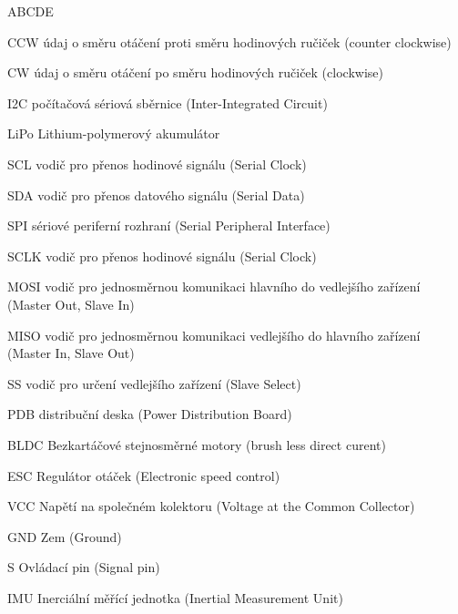 
\begin{seznamzkratek}{ABCDE}  
	
			{CCW}
			{údaj o směru otáčení proti směru hodinových ručiček  (counter clockwise)}
	
			{CW}
			{údaj o směru otáčení po směru hodinových ručiček (clockwise)}    
	      
	      {I2C}
	      {počítačová sériová sběrnice (Inter-Integrated Circuit)}
	      
		  {LiPo}
	      {Lithium-polymerový akumulátor}
	      
	      
	      {SCL}
	      {vodič pro přenos hodinové signálu (Serial Clock)}
	      
	      {SDA}
	      {vodič pro přenos datového signálu (Serial Data)}
	      
	      {SPI}
	      {sériové periferní rozhraní (Serial Peripheral Interface)}
	      
		  {SCLK}
		  {vodič pro přenos hodinové signálu (Serial Clock)}
		  
		  {MOSI}
		  {vodič pro jednosměrnou komunikaci hlavního do vedlejšího zařízení (Master Out, Slave In)}
		  
		  {MISO}
		  {vodič pro jednosměrnou komunikaci vedlejšího do hlavního zařízení (Master In, Slave Out)}
		  
		  {SS}
		  {vodič pro určení vedlejšího zařízení (Slave Select)}
      
	      {PDB}
	      {distribuční deska  (Power Distribution Board)}

	      {BLDC}
	      {Bezkartáčové stejnosměrné motory (brush less direct curent)}
	      
	      {ESC}
	      {Regulátor otáček (Electronic speed control)}	      
	    
	      {VCC}
	      {Napětí na společném kolektoru (Voltage at the Common Collector)} 
  
  		  {GND}
          {Zem (Ground)} 
          
          {S}
          {Ovládací pin (Signal pin)} 

		  {IMU}
          {Inerciální měřící jednotka (Inertial Measurement Unit)} 
          

\end{seznamzkratek}
